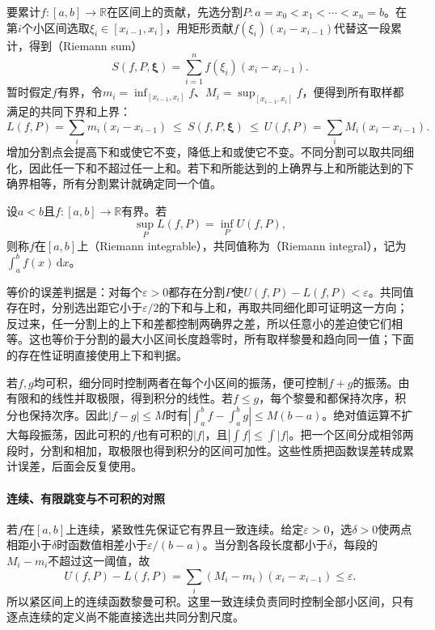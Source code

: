 要累计$f:[a,b]\to\mathbb R$在区间上的贡献，先选分割$P:a=x_0<x_1<\cdots<x_n=b$。在第$i$个小区间选取$\xi_i\in[x_{i-1},x_i]$，用矩形贡献$f(\xi_i)(x_i-x_{i-1})$代替这一段累计，得到（Riemann sum）
\[
 S(f,P,\bm\xi)=\sum_{i=1}^n f(\xi_i)(x_i-x_{i-1}).
\]
暂时假定$f$有界，令$m_i=\inf_{[x_{i-1},x_i]}f$、$M_i=\sup_{[x_{i-1},x_i]}f$，便得到所有取样都满足的共同下界和上界：
\begin{equation}
 L(f,P)=\sum_i m_i(x_i-x_{i-1})
 \ \leq\ S(f,P,\bm\xi)\ \leq\
 U(f,P)=\sum_i M_i(x_i-x_{i-1}).
\label{eq:analysis-riemann-upper-lower-sums}
\end{equation}
增加分割点会提高下和或使它不变，降低上和或使它不变。不同分割可以取共同细化，因此任一下和不超过任一上和。若下和所能达到的上确界与上和所能达到的下确界相等，所有分割累计就确定同一个值。
\begin{definition}[黎曼可积与黎曼积分]
\label{def:analysis-riemann-integral}
设$a<b$且$f:[a,b]\to\mathbb R$有界。若
\[
 \sup_P L(f,P)=\inf_P U(f,P),
\]
则称$f$在$[a,b]$上（Riemann integrable），共同值称为（Riemann integral），记为$\int_a^b f(x)\,\mathrm dx$。
\end{definition}
等价的误差判据是：对每个$\varepsilon>0$都存在分割$P$使$U(f,P)-L(f,P)<\varepsilon$。共同值存在时，分别选出距它小于$\varepsilon/2$的下和与上和，再取共同细化即可证明这一方向；反过来，任一分割上的上下和差都控制两确界之差，所以任意小的差迫使它们相等。这也等价于分割的最大小区间长度趋零时，所有取样黎曼和趋向同一值；下面的存在性证明直接使用上下和判据。

若$f,g$均可积，细分同时控制两者在每个小区间的振荡，便可控制$f+g$的振荡。由有限和的线性并取极限，得到积分的线性。若$f\leq g$，每个黎曼和都保持次序，积分也保持次序。因此$|f-g|\leq M$时有$|\int_a^b f-\int_a^b g|\leq M(b-a)$。绝对值运算不扩大每段振荡，因此可积的$f$也有可积的$|f|$，且$|\int f|\leq\int|f|$。把一个区间分成相邻两段时，分割和相加，取极限也得到积分的区间可加性。这些性质把函数误差转成累计误差，后面会反复使用。

\paragraph{连续、有限跳变与不可积的对照}

若$f$在$[a,b]$上连续，紧致性先保证它有界且一致连续。给定$\varepsilon>0$，选$\delta>0$使两点相距小于$\delta$时函数值相差小于$\varepsilon/(b-a)$。当分割各段长度都小于$\delta$，每段的$M_i-m_i$不超过这一阈值，故
\[
 U(f,P)-L(f,P)=\sum_i(M_i-m_i)(x_i-x_{i-1})\leq\varepsilon.
\]
所以紧区间上的连续函数黎曼可积。这里一致连续负责同时控制全部小区间，只有逐点连续的定义尚不能直接选出共同分割尺度。

